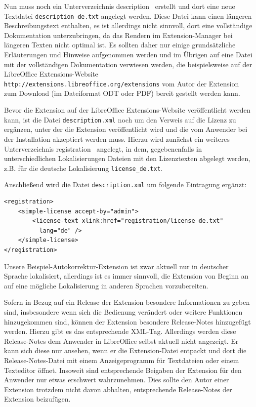 \documentclass[a4paper,10pt,pagesize,titlepage]{scrbook}
\begin{document}
Nun muss noch ein Unterverzeichnis \glqq description\grqq~ erstellt und dort eine neue Textdatei \verb|description_de.txt| angelegt werden. Diese Datei kann einen längeren Beschreibungstext enthalten, es ist allerdings nicht sinnvoll, dort eine vollständige Dokumentation unterzubringen, da das Rendern im Extension-Manager bei längeren Texten nicht optimal ist. Es sollten daher nur einige grundsätzliche Erläuterungen und Hinweise aufgenommen werden und im Übrigen auf eine Datei mit der vollständigen Dokumentation verwiesen werden, die beispielsweise auf der LibreOffice Extensions-Website \verb|http://extensions.libreoffice.org/extensions| vom Autor der Extension zum Download (im Dateiformat ODT oder PDF) bereit gestellt werden kann.

Bevor die Extension auf der LibreOffice Extensions-Website veröffentlicht werden kann, ist die Datei \verb|description.xml| noch um den Verweis auf die Lizenz zu ergänzen, unter der die Extension veröffentlicht wird und die vom Anwender bei der Installation akzeptiert werden muss. Hierzu wird zunächst ein weiteres Unterverzeichnis \glqq registration\grqq~ angelegt, in dem, gegebenenfalls in unterschiedlichen Lokalisierungen Dateien mit den Lizenztexten abgelegt werden, z.B. für die deutsche Lokalisierung \verb|license_de.txt|. 

Anschließend wird die Datei \verb|description.xml| um folgende Eintragung ergänzt:
\begin{lstlisting}
<registration>
    <simple-license accept-by="admin">
        <license-text xlink:href="registration/license_de.txt" 
          lang="de" />
    </simple-license>
</registration>
\end{lstlisting}

Unsere Beispiel-Autokorrektur-Extension ist zwar aktuell nur in deutscher Sprache lokalisiert, allerdings ist es immer sinnvoll, die Extension von Beginn an auf eine mögliche Lokalisierung in anderen Sprachen vorzubereiten.

Sofern in Bezug auf ein Release der Extension besondere Informationen zu geben sind, insbesondere wenn sich die Bedienung verändert oder weitere Funktionen hinzugekommen sind, können der Extension besondere Release-Notes hinzugefügt werden. Hierzu gibt es das entsprechende XML-Tag. Allerdings werden diese Release-Notes dem Anwender in LibreOffice selbst aktuell nicht angezeigt. Er kann sich diese nur ansehen, wenn er die Extension-Datei entpackt und dort die Release-Notes-Datei mit einem Anzeigeprogramm für Textdateien oder einem Texteditor öffnet. Insoweit sind entsprechende Beigaben der Extension für den Anwender nur etwas erschwert wahrzunehmen. Dies sollte den Autor einer Extension trotzdem nicht davon abhalten, entsprechende Release-Notes der Extension beizufügen.
\end{document}
